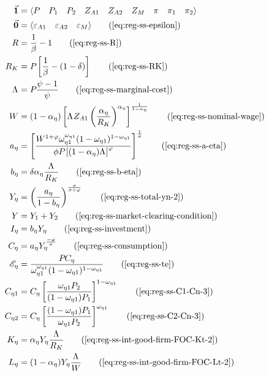 \documentclass[../thesis.tex]{subfiles}
\begin{document}
	\vspace*{-1cm}

	\begin{align}
		\vec{\bm{1}} &= \langle \begin{matrix} P & P_{1} & P_{2} & Z_{A1} & Z_{A2} & Z_{M} & \pi & \pi_{1} & \pi_{2} \end{matrix} \rangle \label{eq:reg-unity-vector}
		\\
		\vec{\bm{0}} &= \langle \begin{matrix} \varepsilon_{A1} & \varepsilon_{A2} & \varepsilon_{M} \end{matrix} \rangle \tag{\ref{eq:reg-ss-epsilon}}
		\\
		R &= \frac{1}{\beta} - 1 \tag{\ref{eq:reg-ss-R}}
		\\
		R_K &= P_{} \left[ \frac{1}{\beta} - (1-\delta) \right] \tag{\ref{eq:reg-ss-RK}}
		\\
		\Lambda_{} &= P_{} \frac{\psi-1}{\psi} \tag{\ref{eq:reg-ss-marginal-cost}}
		\\
		W &= (1-{\alpha_{\eta}}) \left[ \Lambda_{} Z_{A1} \left( \frac{{\alpha_{\eta}}}{R_K} \right)^{{\alpha_{\eta}}} \right]^\frac{1}{1-{\alpha_{\eta}}} \tag{\ref{eq:reg-ss-nominal-wage}}
		\\ %
		a_{\eta} &= \left[ \frac{W^{1 +\varphi} \omega_{\eta 1}^{\omega_{\eta 1}} (1 -\omega_{\eta 1})^{1 -\omega_{\eta 1}}}{\phi P_{} \left[ (1 -\alpha_{\eta}) \Lambda_{} \right]^{\varphi}} \right]^{\frac{1}{\sigma}} \tag{\ref{eq:reg-ss-a-eta}}
		\\
		b_{\eta} &= \delta {\alpha_{\eta}} \frac{\Lambda_{}}{R_K} \tag{\ref{eq:reg-ss-b-eta}}
		\\
		Y_{\eta} &= \left( \frac{a_{\eta}}{1 - b_{\eta}} \right)^{\frac{\sigma}{\sigma + \varphi}} \tag{\ref{eq:reg-ss-total-yn-2}}
		\\
		Y &= Y_{1} + Y_{2} \tag{\ref{eq:reg-ss-market-clearing-condition}}
		\\
		I_{\eta} &= b_{\eta} Y_{\eta} \tag{\ref{eq:reg-ss-investment}}
		\\
		C_{\eta} &= a_{\eta} Y_{\eta}^{\frac{-\varphi}{\sigma}} \tag{\ref{eq:reg-ss-consumption}}
		\\
		\te[] &= \frac{P_{} C_{\eta}}{\omega_{\eta 1}^{\omega_{\eta 1}} (1 -\omega_{\eta 1})^{1 -\omega_{\eta 1}}} \tag{\ref{eq:reg-ss-te}}
		\\
		C_{\eta 1} &= C_{\eta} \left[ \frac{\omega_{\eta 1} P_{2}}{(1 - \omega_{\eta 1}) P_{1}} \right]^{1-\omega_{\eta 1}} \tag{\ref{eq:reg-ss-C1-Cn-3}}
		\\
		C_{\eta 2} &= C_{\eta} \left[ \frac{(1 - \omega_{\eta 1}) P_{1}}{\omega_{\eta 1} P_{2}} \right]^{\omega_{\eta 1}} \tag{\ref{eq:reg-ss-C2-Cn-3}}
		\\
		K_{\eta} &= {\alpha_{\eta}} Y_{\eta} \frac{\Lambda_{}}{R_K} \tag{\ref{eq:reg-ss-int-good-firm-FOC-Kt-2}}
		\\
		L_{\eta} &= (1-{\alpha_{\eta}}) Y_{\eta} \frac{\Lambda_{}}{W} \tag{\ref{eq:reg-ss-int-good-firm-FOC-Lt-2}}
	\end{align}
\end{document}
